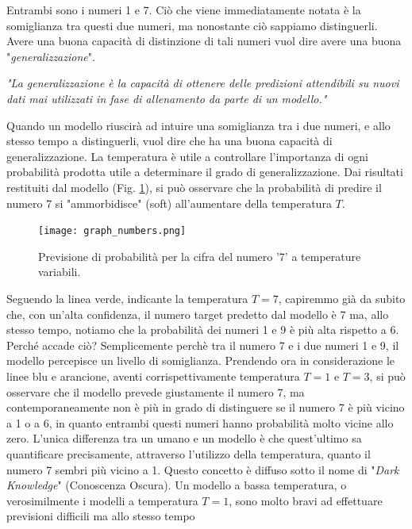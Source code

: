 Entrambi sono i numeri 1 
e 7. Ciò che viene immediatamente notata è la somiglianza tra questi due 
numeri, ma nonostante ciò sappiamo distinguerli. Avere una buona capacità 
di distinzione di tali numeri vuol dire avere una buona "\emph{generalizzazione}". 
\begin{displayquote}
    \emph{"La generalizzazione è la capacità di ottenere delle predizioni 
    attendibili su nuovi dati mai utilizzati in fase di allenamento 
    da parte di un modello."}
\end{displayquote}
Quando un modello riuscirà ad intuire una somiglianza tra i due numeri, 
e allo stesso tempo a distinguerli, vuol dire che ha una buona capacità di 
generalizzazione. La temperatura è utile a controllare l'importanza di ogni 
probabilità prodotta utile a determinare il grado di generalizzazione. Dai 
risultati restituiti dal modello (Fig. \ref{7_1}), si può osservare che la probabilità 
di predire il numero 7 si "ammorbidisce" (soft) all'aumentare della temperatura $T$.
\begin{figure}
    \centering
    \texttt{[image: graph\_numbers.png]}
    \centering
    \caption{Previsione di probabilità per la cifra del numero '7' a temperature variabili.}
    \label{7_1}
\end{figure}
Seguendo la linea verde, indicante la temperatura $T=7$, capiremmo già da 
subito che, con un'alta confidenza, il numero target predetto dal modello è 7 
ma, allo stesso tempo, notiamo che la probabilità dei numeri 1 e 9 è più alta 
rispetto a 6. Perché accade ciò? Semplicemente perchè tra il numero 7 e i 
due numeri 1 e 9, il modello percepisce un livello di somiglianza. Prendendo 
ora in considerazione le linee blu e arancione, aventi corrispettivamente 
temperatura $T=1$ e $T=3$, si può osservare che il modello prevede giustamente 
il numero 7, ma contemporaneamente non è più in grado di distinguere se il 
numero 7 è più vicino a 1 o a 6, in quanto entrambi questi numeri hanno 
probabilità molto vicine allo zero. L'unica differenza tra un umano e un 
modello è che quest'ultimo sa quantificare precisamente, attraverso l'utilizzo 
della temperatura, quanto il numero 7 sembri più vicino a 1. Questo concetto 
è diffuso sotto il nome di "\emph{Dark Knowledge}" (Conoscenza Oscura). Un 
modello a bassa temperatura, o verosimilmente i modelli a temperatura 
$T=1$, sono molto bravi ad effettuare previsioni difficili ma allo stesso tempo 
